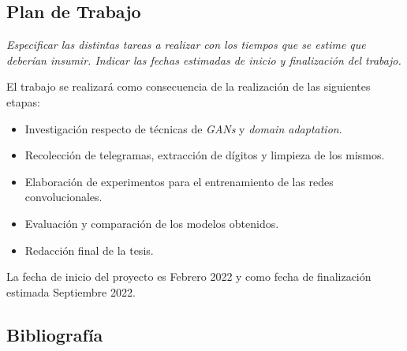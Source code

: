 \documentclass[a4paper, twoside]{report}
\begin{document}
\subsection*{Plan de Trabajo}
{\it Especificar las distintas tareas a realizar con los tiempos que se
	estime que deberían insumir.
	Indicar las fechas estimadas de inicio y finalización del trabajo.
}

El trabajo se realizar\'a como consecuencia de la realizaci\'on de las
siguientes etapas:
\begin{itemize}
	\item Investigaci\'on respecto de técnicas de {\it GANs} y {\it domain adaptation}.
	\item Recolecci\'on de telegramas, extracci\'on de d\'igitos y limpieza de los
	      mismos.
	\item Elaboraci\'on de experimentos para el entrenamiento de las redes
	      convolucionales.
	\item Evaluaci\'on y comparaci\'on de los modelos obtenidos.
	\item Redacci\'on final de la tesis.
\end{itemize}

La fecha de inicio del proyecto es Febrero 2022 y como fecha de finalizaci\'on
estimada Septiembre 2022.

\subsection*{Bibliograf\'ia}
{
	\renewcommand{\chapter}[2]{}
	
	
}
\end{document}
